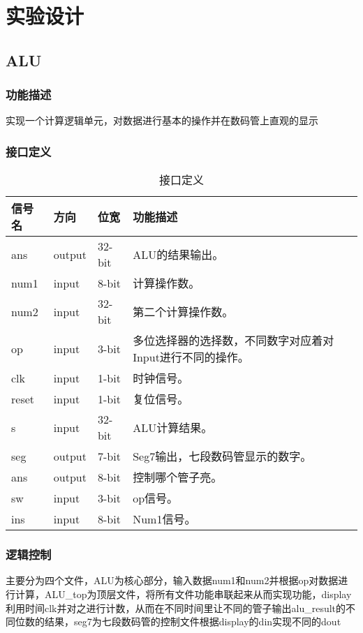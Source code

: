 \section{实验设计}
\subsection{ALU}\label{sub:alu}
\subsubsection{功能描述}
实现一个计算逻辑单元，对数据进行基本的操作并在数码管上直观的显示
\subsubsection{接口定义}
\begin{table}[htp]
	\caption{接口定义}\label{tab:signaldef1}
	\begin{center}
		\begin{tabular}{|l|l|l|p{6cm}|}
		\hline
		\textbf{信号名} & \textbf{方向} & \textbf{位宽} & \textbf{功能描述}\\ \hline \hline
		ans		& output	& 32-bit	& ALU的结果输出。\\ \hline
		num1	& input		& 8-bit		& 计算操作数。\\ \hline
		num2	& input		& 32-bit	& 第二个计算操作数。\\ \hline
		op		& input		& 3-bit		& 多位选择器的选择数，不同数字对应着对Input进行不同的操作。\\ \hline
		clk		& input		& 1-bit		& 时钟信号。\\ \hline
		reset	& input		& 1-bit		& 复位信号。\\ \hline
		s		& input		& 32-bit	& ALU计算结果。\\ \hline
		seg		& output	& 7-bit		& Seg7输出，七段数码管显示的数字。\\ \hline
		ans		& output	& 8-bit		& 控制哪个管子亮。\\ \hline
		sw		& input		& 3-bit		& op信号。\\ \hline
		ins		& input		& 8-bit		& Num1信号。\\ \hline
		\end{tabular}
	\end{center}
\end{table}		

\subsubsection{逻辑控制}
主要分为四个文件，ALU为核心部分，输入数据num1和num2并根据op对数据进行计算，ALU\_top为顶层文件，将所有文件功能串联起来从而实现功能，display利用时间clk并对之进行计数，从而在不同时间里让不同的管子输出alu\_result的不同位数的结果，seg7为七段数码管的控制文件根据display的din实现不同的dout

